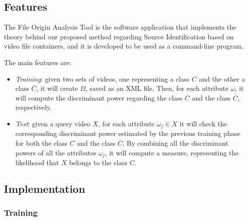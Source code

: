 \subsection{Features}

The File Origin Analysis Tool is the software application that implements the theory behind our proposed method regarding Source Identification based on video file containers, and it is developed to be used as a command-line program.

The main features are:
\begin{itemize}

\item \emph{Training}: given two sets of videos, one representing a class $C$ and the other a class $\overline{C}$, it will create $\Omega$, saved as an XML file. Then, for each attribute $\omega$, it will compute the discriminant power regarding the class $C$ and the class $\overline{C}$, respectively.

\item \emph{Test}: given a query video $X$, for each attribute $\omega_{j} \in X$ it will check the corresponding discriminant power estimated by the previous training phase for both the class $C$ and the class $\overline{C}$. By combining all the discriminant powers of all the attributes $\omega_{j}$, it will compute a measure, representing the likelihood that $X$ belongs to the class $C$.

\end{itemize}

\subsection{Implementation}

\subsubsection*{Training}

